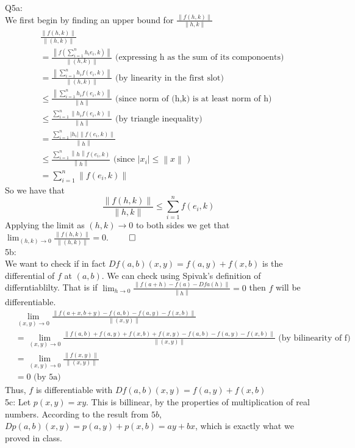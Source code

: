 \documentclass[letterpaper]{article}
\newcommand{\norm}[1]{\left\lVert#1\right\rVert}
\begin{document}
Q5a:\\
We first begin by finding an upper bound for $\frac{\norm{f(h,k)}}{\norm{h,k}}$
\begin{align*}
   & \frac{\norm{f(h,k)}}{\norm{(h,k)}}
   \\ & = \frac{\norm{f(\sum_{i=1}^n h_i e_i,k)}}{\norm{(h,k)}} \text{ (expressing h as the sum of its componoents)}
   \\ & = \frac{\norm{\sum_{i=1}^n h_i f(e_i,k)}}{\norm{(h,k)}} \text{ (by linearity in the first slot)}
   \\ & \leq \frac{\norm{\sum_{i=1}^n h_i f(e_i,k)}}{\norm{h}} \text{ (since norm of (h,k) is at least norm of h)}
   \\ & \leq \frac{\sum_{i=1}^n \norm{h_i f(e_i,k)}}{\norm{h}} \text{ (by triangle inequality)}
   \\ & = \frac{\sum_{i=1}^n |h_i| \norm{f(e_i,k)}}{\norm{h}} 
   \\ & \leq \frac{\sum_{i=1}^n \norm{h} f(e_i,k)}{\norm{h}} \text{ (since $|x_i| \leq \norm{x}$ )}
   \\ & = \sum_{i=1}^n \norm{f(e_i,k)}
\end{align*}
So we have that $$\frac{\norm{f(h,k)}}{\norm{h,k}} \leq \sum_{i=1}^n f(e_i,k)$$ Applying the limit as $(h,k) \rightarrow 0$ to both sides we get that $\lim_{(h,k)\rightarrow 0 } \frac{\norm{f(h,k)}}{\norm{(h,k)}}=0$. $\qed$
\\ 5b:\\
We want to check if in fact $Df(a,b)(x,y) = f(a,y) + f(x,b)$ is the differential of $f$ at $(a,b)$. We can check using Spivak's definition of differntiablilty. That is if $\lim_{h \rightarrow 0 } \frac{\norm{f(a+h)-f(a)-Dfa(h)}}{\norm{h}} = 0$ then $f$ will be differentiable.
\begin{align*}
   & \lim_{(x,y) \rightarrow 0 } \frac{\norm{f(a+x,b+y) - f(a,b) - f(a,y) - f(x,b)}}{\norm{(x,y)}}
   \\ & = \lim_{(x,y) \rightarrow 0} \frac{\norm{f(a,b) + f(a,y) + f(x,b) + f(x,y) - f(a,b) - f(a,y) - f(x,b)}}{\norm{(x,y)}} \text{ (by bilinearity of f)}
   \\ & = \lim _{(x,y) \rightarrow 0 } \frac{\norm{f(x,y)}}{\norm{(x,y)}}
   \\ & = 0 \text{ (by 5a)}
\end{align*} 
Thus, $f$ is differentiable with $Df(a,b)(x,y) = f(a,y) + f(x,b)$
\\5c: Let $p(x,y) = xy$. This is billinear, by the properties of multiplication of real numbers. According to the result from $5b$, $Dp(a,b)(x,y) = p(a,y)  + p(x,b) = ay + bx$, which is exactly what we proved in class. 
\end{document}
